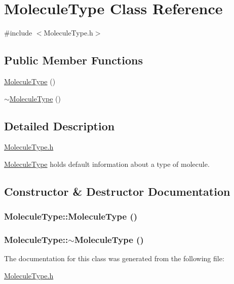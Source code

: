 \hypertarget{classMoleculeType}{
\section{MoleculeType Class Reference}
\label{classMoleculeType}
}


{\ttfamily \#include $<$MoleculeType.h$>$}\subsection*{Public Member Functions}
\begin{DoxyCompactItemize}
\item 
\hyperlink{classMoleculeType_aac38f7675a0f8a29bd7cecd5e5ddb97b}{MoleculeType} ()
\item 
\hyperlink{classMoleculeType_a1b62655acafa2ba0271a7bc5cab51357}{$\sim$MoleculeType} ()
\end{DoxyCompactItemize}


\subsection{Detailed Description}
\hyperlink{MoleculeType_8h}{MoleculeType.h}

\hyperlink{classMoleculeType}{MoleculeType} holds default information about a type of molecule. 

\subsection{Constructor \& Destructor Documentation}
\hypertarget{classMoleculeType_aac38f7675a0f8a29bd7cecd5e5ddb97b}{
\subsubsection[{MoleculeType}]{\setlength{\rightskip}{0pt plus 5cm}MoleculeType::MoleculeType ()}}
\label{classMoleculeType_aac38f7675a0f8a29bd7cecd5e5ddb97b}
\hypertarget{classMoleculeType_a1b62655acafa2ba0271a7bc5cab51357}{
\subsubsection[{$\sim$MoleculeType}]{\setlength{\rightskip}{0pt plus 5cm}MoleculeType::$\sim$MoleculeType ()}}
\label{classMoleculeType_a1b62655acafa2ba0271a7bc5cab51357}


The documentation for this class was generated from the following file:\begin{DoxyCompactItemize}
\item 
\hyperlink{MoleculeType_8h}{MoleculeType.h}\end{DoxyCompactItemize}
